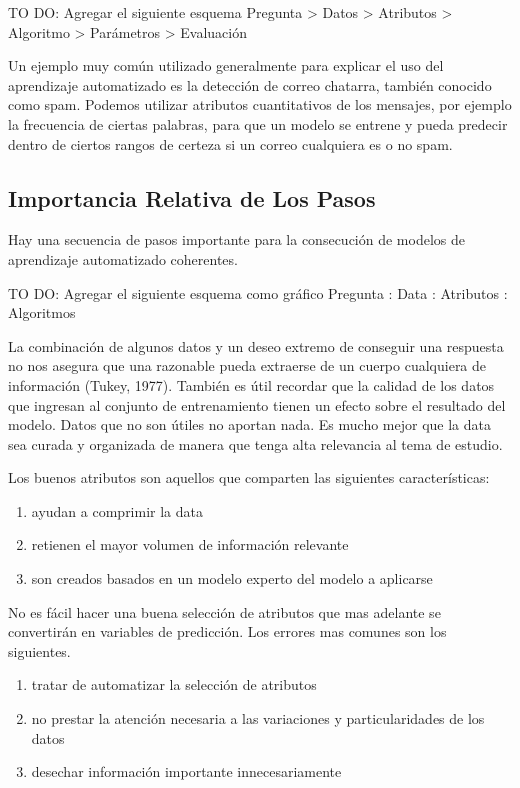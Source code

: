 TO DO: Agregar el siguiente esquema
Pregunta > Datos > Atributos > Algoritmo > Parámetros > Evaluación

Un ejemplo muy común utilizado generalmente para explicar el uso del aprendizaje automatizado es la detección de correo chatarra, también conocido como spam. Podemos utilizar atributos cuantitativos de los mensajes, por ejemplo la frecuencia de ciertas palabras, para que un modelo se entrene y pueda predecir dentro de ciertos rangos de certeza si un correo cualquiera es o no spam. 

\subsection{Importancia Relativa de Los Pasos}

Hay una secuencia de pasos importante para la consecución de modelos de aprendizaje automatizado coherentes.

TO DO: Agregar el siguiente esquema como gráfico
Pregunta : Data : Atributos : Algoritmos

La combinación de algunos datos y un deseo extremo de conseguir una respuesta no nos asegura que una razonable pueda extraerse de un cuerpo cualquiera de información (Tukey, 1977). También es útil recordar que la calidad de los datos que ingresan al conjunto de entrenamiento tienen un efecto sobre el resultado del modelo. Datos que no son útiles no aportan nada. Es mucho mejor que la data sea curada y organizada de manera que tenga alta relevancia al tema de estudio. 

Los buenos atributos son aquellos que comparten las siguientes características:

\begin{enumerate}
	\item ayudan a comprimir la data
	\item retienen el mayor volumen de información relevante
	\item son creados basados en un modelo experto del modelo a aplicarse
\end{enumerate}

No es fácil hacer una buena selección de atributos que mas adelante se convertirán en variables de predicción. Los errores mas comunes son los siguientes. 

\begin{enumerate}
	\item tratar de automatizar la selección de atributos
	\item no prestar la atención necesaria a las variaciones y particularidades de los datos
	\item desechar información importante innecesariamente
\end{enumerate}

